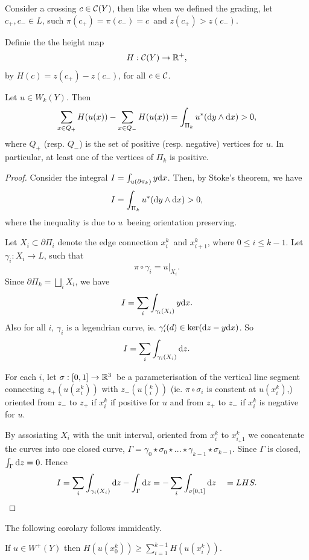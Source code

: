 

Consider a crossing $c \in \mathcal{C}(Y)$, then like when we defined the grading,
let $c_+, c_- \in L$, such $\pi(c_+) = \pi(c_-) = c$ and $z(c_+) > z(c_-)$.

\begin{defn}
Definie the the height map 
\[ H : \mathcal{C}(Y) \to  \mathbb{R}^+, \]
by 
$ H(c) = z(c_+) - z(c_-)$, for all $c \in \mathcal{C}$.
\end{defn}


\begin{lemma}
\label{prop:l_6.1}
Let $u \in W_k(Y)$. Then 
\[ \sum_{x \in Q_+} H(u(x)) - \sum_{x\in Q_-} H(u(x)) = \int_{\Pi_k} u^*(\mathrm{d} y \wedge \mathrm{d} x) > 0, \]
where $Q_+$ (resp. $Q_-$) is the set of positive (resp. negative) vertices for $u$. In particular, at least one of the vertices of $\Pi_k$ is positive.
\end{lemma}

\begin{proof}
Consider the integral $I = \int_{u(\partial \pi_k)} y \mathrm{d} x$. Then, by Stoke's theorem, we have
\[ I = \int_{\Pi_k} u^*(\mathrm{d} y \wedge \mathrm{d} x) > 0, \]
where the inequality is due to $u$ beeing orientation preserving.

Let $X_i \subset \partial \Pi_i$ denote the edge connection $x^k_i$ and $x^k_{i+1}$,
where $0\le i\le k-1$. Let $\gamma_i : X_i \to L$, such that 
\[ \pi \circ \gamma_i = u|_{X_i}. \] 
Since $\partial \Pi_k = \bigsqcup_i X_i$, we have 
\[ I = \sum_i \int_{\gamma_i(X_i)} y \mathrm{d} x. \]
Also for all $i$, $\gamma_i$ is a legendrian curve, ie. 
$\gamma_i'(d) \in \operatorname{ker} ( \mathrm{d} z - y \mathrm{d} x )$. So
\[ I = \sum_i \int_{\gamma_i(X_i)} \mathrm{d} z. \]

For each $i$, let $\sigma: [0,1] \to \mathbb{R}^3$ be a
parameterisation of the vertical line
segment connecting $z_+(u(x^k_i))$ with $z_-(u(^k_i))$ (ie. $\pi \circ
\sigma_i$ is constent at $u(x^k_i)$,) oriented from $z_-$ to $z_+$ if $x^k_i$ if positive for $u$ and from $z_+$ to $z_-$ if $x^k_i$ is negative for $u$. 

By assosiating $X_i$ with the unit interval, oriented from $x^k_i$ to
$x^k_{i_+1}$ we concatenate the curves into one closed curve, 
$\Gamma = \gamma_0 \star \sigma_0 \star ... \star \gamma_{k-1} \star
\sigma_{k-1}$. 
Since $\Gamma$ is closed, $\int_\Gamma \mathrm{d} z = 0$. Hence 
%
\[ I = \sum_i \int_{\gamma_i(X_i)} \mathrm{d} z - \int_\Gamma \mathrm{d} z = -\sum_i
\int_{\sigma{[0,1]}} \mathrm{d} z \quad = LHS.  \]
\end{proof}
%
The following corolary follows immideatly.
\begin{corol}
\label{prop:height_sum}
If $u \in W^+(Y)$ then $H(u(x^k_0)) \ge \sum_{i=1}^{k-1} H(u(x^k_i))$.
\end{corol}

